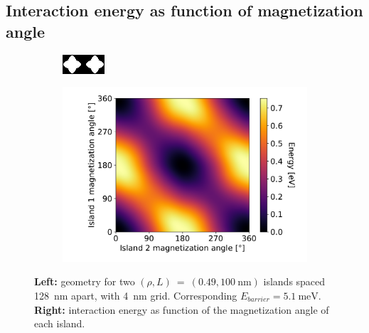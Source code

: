 \documentclass[11pt,a4paper,english]{article}
\begin{document}
\subsection{Interaction energy as function of magnetization angle}
\label{par:TwoIslands_InteractionAngle}
\begin{figure}
    \centering
    \begin{subfigure}[c]{4cm} %
         \centering
         \includegraphics[width=\textwidth]{Figures/two_islands/Geometry/geom_r0.49_s100_d128_a0,0_cell4nm.png}
     \end{subfigure}
    \begin{subfigure}[c]{0.7\columnwidth}
         \centering
         \includegraphics[width=\textwidth]{Figures/two_islands/EnergyLandscape/Int_a0Pi,0Pi_d128_r0.49,0.49_cell4nm.pdf}
     \end{subfigure}
    \caption{\textbf{Left:} geometry for two $(\rho, L)~=~(0.49, \SI{100}{\nano\metre})$ islands spaced \SI{128}{\nano\metre} apart, with \SI{4}{\nano\metre} grid. Corresponding $E_{barrier}=\SI{5.1}{\milli\electronvolt}$. \textbf{Right:} interaction energy as function of the magnetization angle of each island.}
    \label{fig:two-islands_interaction_(r0.49_L100)_a0and0}
\end{figure}
\end{document}
